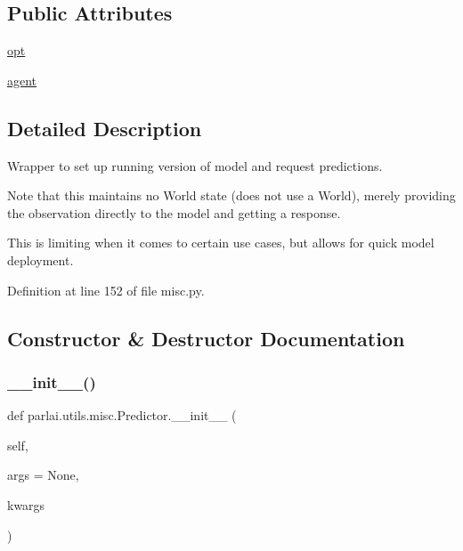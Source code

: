 \subsection*{Public Attributes}
\begin{DoxyCompactItemize}
\item 
\hyperlink{classparlai_1_1utils_1_1misc_1_1Predictor_a608b3d7f6722389f3a7eeed0ec5772b7}{opt}
\item 
\hyperlink{classparlai_1_1utils_1_1misc_1_1Predictor_a0ea35fd562c6edaa6affd03006f1bd08}{agent}
\end{DoxyCompactItemize}


\subsection{Detailed Description}
\begin{DoxyVerb}Wrapper to set up running version of model and request predictions.

Note that this maintains no World state (does not use a World), merely
providing the observation directly to the model and getting a response.

This is limiting when it comes to certain use cases, but allows for quick
model deployment.
\end{DoxyVerb}
 

Definition at line 152 of file misc.\+py.



\subsection{Constructor \& Destructor Documentation}
\mbox{\label{classparlai_1_1utils_1_1misc_1_1Predictor_a40aaf55870ba3c02fc2bff2ef5d2a9b7}} 
\subsubsection{\texorpdfstring{\+\_\+\+\_\+init\+\_\+\+\_\+()}{\_\_init\_\_()}}
{\footnotesize\ttfamily def parlai.\+utils.\+misc.\+Predictor.\+\_\+\+\_\+init\+\_\+\+\_\+ (\begin{DoxyParamCaption}\item[{}]{self,  }\item[{}]{args = {\ttfamily None},  }\item[{}]{kwargs }\end{DoxyParamCaption})}

